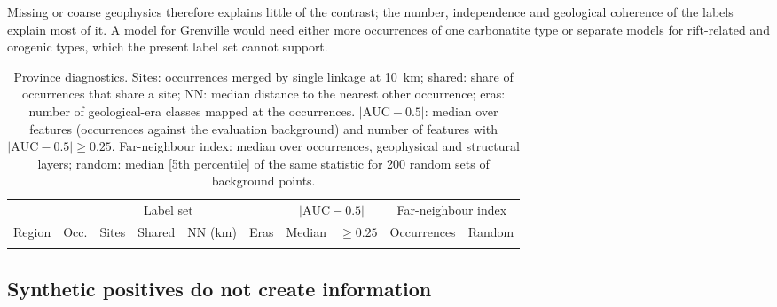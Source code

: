 \documentclass[pdflatex,sn-apa]{sn-jnl}
\begin{document}
Missing or coarse geophysics therefore explains little of the contrast; the number, independence and geological coherence of the labels explain most of it. A model for Grenville would need either more occurrences of one carbonatite type or separate models for rift-related and orogenic types, which the present label set cannot support.

\begin{table}[t]
\caption{Province diagnostics. Sites: occurrences merged by single linkage at 10~km; shared: share of occurrences that share a site; NN: median distance to the nearest other occurrence; eras: number of geological-era classes mapped at the occurrences. $|\mathrm{AUC}-0.5|$: median over features (occurrences against the evaluation background) and number of features with $|\mathrm{AUC}-0.5| \geq 0.25$. Far-neighbour index: median over occurrences, geophysical and structural layers; random: median [5th percentile] of the same statistic for 200 random sets of background points.}\label{tab:region-diag}
\scriptsize
\setlength{\tabcolsep}{2.5pt}
\begin{tabular*}{\textwidth}{@{\extracolsep\fill}lccccccccc}
\toprule
 & \multicolumn{5}{c}{Label set} & \multicolumn{2}{c}{$|\mathrm{AUC}-0.5|$} & \multicolumn{2}{c}{Far-neighbour index} \\
\cmidrule(lr){2-6}\cmidrule(lr){7-8}\cmidrule(lr){9-10}
Region & Occ. & Sites & Shared & NN (km) & Eras & Median & $\geq 0.25$ & Occurrences & Random \\
\midrule
\botrule
\end{tabular*}
\end{table}

\subsection{Synthetic positives do not create information}\label{sec:disc-gan}
\end{document}
